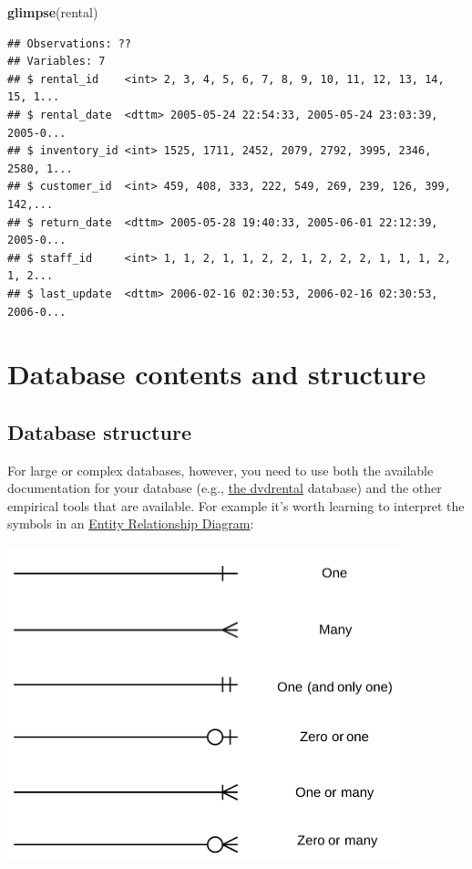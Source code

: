 \documentclass[]{book}
\newenvironment{Shaded}{\begin{snugshade}}{\end{snugshade}}
\newcommand{\KeywordTok}[1]{\textcolor[rgb]{0.13,0.29,0.53}{\textbf{#1}}}
\newcommand{\NormalTok}[1]{#1}
\theoremstyle{definition}
\theoremstyle{definition}
\theoremstyle{definition}
\theoremstyle{remark}
\begin{document}
\begin{Shaded}
\begin{Highlighting}[]
\KeywordTok{glimpse}\NormalTok{(rental)}
\end{Highlighting}
\end{Shaded}

\begin{verbatim}
## Observations: ??
## Variables: 7
## $ rental_id    <int> 2, 3, 4, 5, 6, 7, 8, 9, 10, 11, 12, 13, 14, 15, 1...
## $ rental_date  <dttm> 2005-05-24 22:54:33, 2005-05-24 23:03:39, 2005-0...
## $ inventory_id <int> 1525, 1711, 2452, 2079, 2792, 3995, 2346, 2580, 1...
## $ customer_id  <int> 459, 408, 333, 222, 549, 269, 239, 126, 399, 142,...
## $ return_date  <dttm> 2005-05-28 19:40:33, 2005-06-01 22:12:39, 2005-0...
## $ staff_id     <int> 1, 1, 2, 1, 1, 2, 2, 1, 2, 2, 2, 1, 1, 1, 2, 1, 2...
## $ last_update  <dttm> 2006-02-16 02:30:53, 2006-02-16 02:30:53, 2006-0...
\end{verbatim}

\hypertarget{database-contents-and-structure}{%
\section{Database contents and
structure}\label{database-contents-and-structure}}

\hypertarget{database-structure}{%
\subsection{Database structure}\label{database-structure}}

For large or complex databases, however, you need to use both the
available documentation for your database (e.g.,
\href{http://www.postgresqltutorial.com/postgresql-sample-database/}{the
dvdrental} database) and the other empirical tools that are available.
For example it's worth learning to interpret the symbols in an
\href{https://en.wikipedia.org/wiki/Entity\%E2\%80\%93relationship_model}{Entity
Relationship Diagram}:

\includegraphics{./screenshots/ER-diagram-symbols.png}
\end{document}
